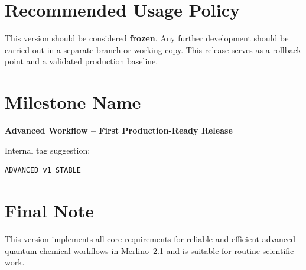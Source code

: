 \documentclass[11pt,a4paper]{article}
\begin{document}
\section*{Recommended Usage Policy}

This version should be considered \textbf{frozen}.
Any further development should be carried out in a separate branch or working
copy. This release serves as a rollback point and a validated production
baseline.

\section*{Milestone Name}

\begin{center}
\textbf{Advanced Workflow -- First Production-Ready Release}
\end{center}

Internal tag suggestion:
\begin{verbatim}
ADVANCED_v1_STABLE
\end{verbatim}

\section*{Final Note}

This version implements all core requirements for reliable and efficient
advanced quantum-chemical workflows in Merlino~2.1 and is suitable for routine
scientific work.
\end{document}
